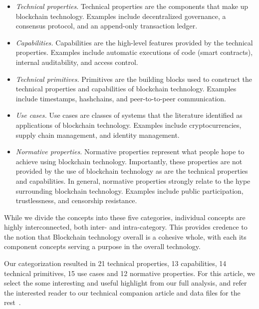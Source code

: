 \begin{itemize}

\item \emph{Technical properties.} Technical properties are the components that make up blockchain technology. Examples include decentralized governance, a consensus protocol, and an append-only transaction ledger.
	
\item \emph{Capabilities.} Capabilities are the high-level features provided by the technical properties. Examples include automatic executions of code (\ie smart contracts), internal auditability, and access control.
	
\item \emph{Technical primitives.} Primitives are the building blocks used to construct the technical properties and capabilities of blockchain technology. Examples include timestamps, hashchains, and peer-to-to-peer communication.
	
\item \emph{Use cases.} Use cases are classes of systems that the literature identified as applications of blockchain technology. Examples include cryptocurrencies, supply chain management, and identity management.
	
\item \emph{Normative properties.} Normative properties represent what people hope to achieve using blockchain technology. Importantly, these properties are not provided by the use of blockchain technology as are the technical properties and capabilities. In general, normative properties strongly relate to the hype surrounding blockchain technology. Examples include public participation, trustlessness, and censorship resistance.

\end{itemize}

While we divide the concepts into these five categories, individual concepts are highly interconnected, both inter- and intra-category. This provides credence to the notion that Blockchain technology overall is a cohesive whole, with each its component concepts serving a purpose in the overall technology.

Our categorization resulted in 21 technical properties, 13 capabilities, 14 technical primitives, 15 use cases and 12 normative properties. For this article, we select the some interesting and useful highlight from our full analysis, and refer the interested reader to our technical companion article and data files for the rest~\cite{RKYCC19}.

